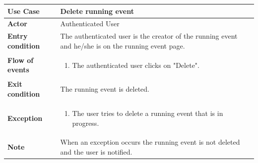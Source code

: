 \documentclass[../main.tex]{subfiles}
\begin{document}
	\begin{center}
		\begin{tabular}{p{3cm}p{8.28cm}}
			\hline
			\textbf{Use Case} & Delete running event\\
			\hline
			\textbf{Actor} & Authenticated User\\
			\hline
			\textbf{Entry condition} & The authenticated user is the creator of the running event and he/she is on the running event page.\\
			\hline
			\textbf{Flow of events} & \begin{enumerate}
				\linespread{0}\item The authenticated user clicks on "Delete".
			\end{enumerate}\\
			\hline
			\textbf{Exit condition} & The running event is deleted.\\
			\hline
			\textbf{Exception}& \begin{enumerate}
				\linespread{0}\item The user tries to delete a running event that is in progress.
			\end{enumerate}\\
			\hline
			\textbf{Note} & When an exception occurs the running event is not deleted and the user is notified.\\
			\hline
		\end{tabular}
	\end{center}
	\vspace*{3cm}
\end{document}
